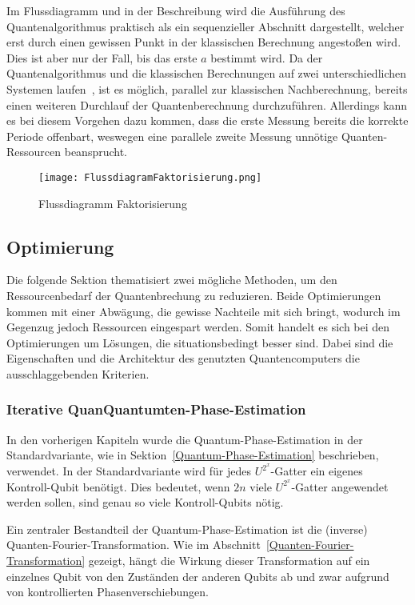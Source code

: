 Im Flussdiagramm und in der Beschreibung 
wird die Ausführung des Quantenalgorithmus praktisch als ein sequenzieller Abschnitt dargestellt, 
welcher erst durch einen gewissen Punkt in der klassischen Berechnung angestoßen wird.
Dies ist aber nur der Fall, bis das erste \(a\) bestimmt wird.
Da der Quantenalgorithmus und die klassischen Berechnungen auf zwei unterschiedlichen Systemen laufen~\cite{IBMQuantumServerless2023}, 
ist es möglich, parallel zur klassischen Nachberechnung, 
bereits einen weiteren Durchlauf der Quantenberechnung durchzuführen. 
Allerdings kann es bei diesem Vorgehen dazu kommen, 
dass die erste Messung bereits die korrekte Periode offenbart, 
weswegen eine parallele zweite Messung unnötige Quanten-Ressourcen beansprucht.

\begin{figure} 
  \centering
  \texttt{[image: FlussdiagramFaktorisierung.png]}
  \caption{Flussdiagramm Faktorisierung}
  \label{fig:Flussdiagramm}
\end{figure}

\subsection{Optimierung} \label{Optimierung}
Die folgende Sektion thematisiert zwei mögliche Methoden, 
um den Ressourcenbedarf der Quantenbrechung zu reduzieren.
Beide Optimierungen kommen mit einer Abwägung, 
die gewisse Nachteile mit sich bringt,
wodurch im Gegenzug jedoch Ressourcen eingespart werden.
Somit handelt es sich bei den Optimierungen um Lösungen, 
die situationsbedingt besser sind.
Dabei sind die Eigenschaften und die Architektur des genutzten Quantencomputers die ausschlaggebenden Kriterien.

\subsubsection{Iterative QuanQuantumten-Phase-Estimation}
In den vorherigen Kapiteln wurde die Quantum-Phase-Estimation in der Standardvariante, 
wie in Sektion~\ref{Quantum-Phase-Estimation} beschrieben, verwendet.
In der Standardvariante wird für jedes \(U^{2^x}\)-Gatter ein eigenes Kontroll-Qubit benötigt.
Dies bedeutet, wenn \(2n\) viele \(U^{2^x}\)-Gatter angewendet werden sollen, 
sind genau so viele Kontroll-Qubits nötig.

Ein zentraler Bestandteil der Quantum-Phase-Estimation ist die (inverse) Quanten-Fourier-Transformation. 
Wie im Abschnitt~\ref{Quanten-Fourier-Transformation} gezeigt, 
hängt die Wirkung dieser Transformation auf ein einzelnes Qubit von den Zuständen der anderen Qubits ab 
und zwar aufgrund von kontrollierten Phasenverschiebungen.


